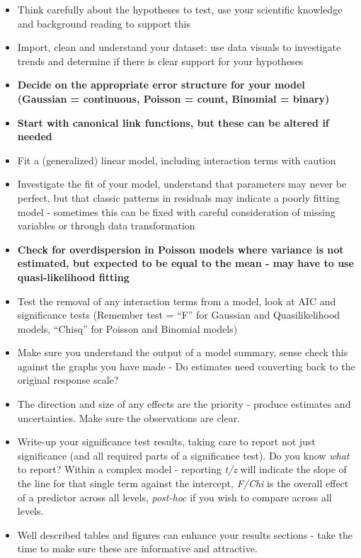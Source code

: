 \documentclass[
]{book}
\begin{document}
\begin{itemize}
\item
  Think carefully about the hypotheses to test, use your scientific knowledge and background reading to support this
\item
  Import, clean and understand your dataset: use data visuals to investigate trends and determine if there is clear support for your hypotheses
\item
  \textbf{Decide on the appropriate error structure for your model (Gaussian = continuous, Poisson = count, Binomial = binary)}
\item
  \textbf{Start with canonical link functions, but these can be altered if needed}
\item
  Fit a (generalized) linear model, including interaction terms with caution
\item
  Investigate the fit of your model, understand that parameters may never be perfect, but that classic patterns in residuals may indicate a poorly fitting model - sometimes this can be fixed with careful consideration of missing variables or through data transformation
\item
  \textbf{Check for overdispersion in Poisson models where variance is not estimated, but expected to be equal to the mean - may have to use quasi-likelihood fitting}
\item
  Test the removal of any interaction terms from a model, look at AIC and significance tests (Remember test = ``F'' for Gaussian and Quasilikelihood models, ``Chisq'' for Poisson and Binomial models)
\item
  Make sure you understand the output of a model summary, sense check this against the graphs you have made - Do estimates need converting back to the original response scale?
\item
  The direction and size of any effects are the priority - produce estimates and uncertainties. Make sure the observations are clear.
\item
  Write-up your significance test results, taking care to report not just significance (and all required parts of a significance test). Do you know \emph{what} to report? Within a complex model - reporting \emph{t/z} will indicate the slope of the line for that single term against the intercept, \emph{F/Chi} is the overall effect of a predictor across all levels, \emph{post-hoc} if you wish to compare across all levels.
\item
  Well described tables and figures can enhance your results sections - take the time to make sure these are informative and attractive.
\end{itemize}
\end{document}
